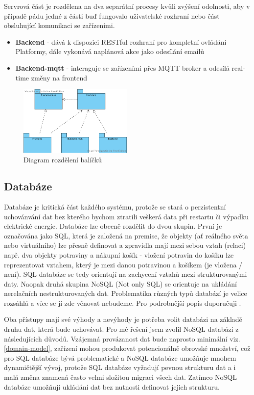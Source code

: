 Servrová část je rozdělena na dva separátní procesy kvůli zvýšení odolnosti, aby v případě pádu jedné z části buď fungovalo uživatelské rozhraní nebo část obsluhující komunikaci se zařízeními.
\begin{itemize}
    \item \textbf{Backend} - dává k dispozici RESTful rozhraní pro kompletní ovládání Platformy, dále vykonává naplánová akce jako odesílání emailů
    \item \textbf{Backend-mqtt} - interaguje se zařízeními přes MQTT broker a odesílá real-time změny na frontend
\end{itemize}

\begin{figure}[htbp]
    \label{packages-uml}
    \centering
    \includegraphics[width=0.5\textwidth]{img/packages.pdf}
    \caption{Diagram rozdělení balíčků}
\end{figure}

\subsection{Databáze}
Databáze je kritická část každého systému, protože se stará o perzistentní uchovánvání dat bez kterého bychom ztratili veškerá data při restartu či výpadku elektrické energie. Databáze lze obecně rozdělit do dvou skupin. První je označována jako SQL, která je založená na premise, že objekty (ať reálného světa nebo virtuálního) lze přesně definovat a zpravidla mají mezi sebou vztah (relaci) např. dva objekty potraviny a nákupní košík - vložení potravin do košíku lze reprezentovat vztahem, který je mezi danou potravinou a košíkem (je vložena / není). SQL databáze se tedy orientují na zachycení vztahů mezi strukturovanými daty. Naopak druhá skupina NoSQL (Not only SQL) se orientuje na ukládání nerelačních nestrukturovaných dat. Problematika různých typů databází je velice rozsáhlá a více se jí zde věnovat nebudeme. Pro podrobnější popis duporučuji \cite{sql-and-nosql}.

Oba přístupy mají své výhody a nevýhody je potřeba volit databázi na základě druhu dat, která bude uchovávat. Pro mé řešení jsem zvolil NoSQL databázi z následujících důvodů. Vzájemná provázanost dat bude naprosto minimální viz. \ref{domain-model}, zařízení mohou produkovat potencionálně obrovské množství, což pro SQL databáze bývá problematické a NoSQL databáze umožňuje mnohem dynamičtější vývoj, protože SQL databáze vyžadují pevnou strukturu dat a i malá změna znamená často velmi složitou migraci všech dat. Zatímco NoSQL databáze umožňují ukládání dat bez nutnosti definovat jejich strukturu.

